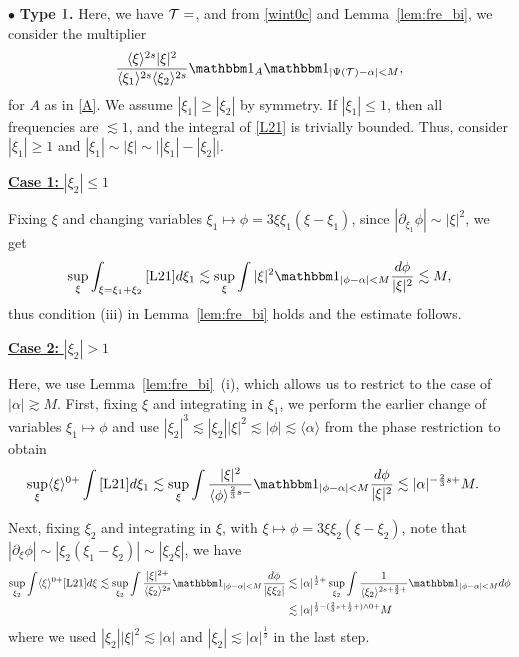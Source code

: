 \documentclass[a4paper,
11pt,  reqno]{amsart}
\makeatletter
\newcommand{\I}{\hspace{0.2mm}\textup{I}\hspace{0.2mm}}
\newcommand{\5}{\textup{V}}
\newcommand{\noi}{\noindent}
\newcommand{\ind}{\mathbbm 1}
\newcommand{\les}{\lesssim}
\theoremstyle{remark}
\newcommand{\bul}{\bullet}
\newcommand{\TT}{\mathcal{T}}
\newcommand{\al}{\alpha}
\newcommand{\ges}{\gtrsim}
\newcommand{\jb}[1]
{\langle #1 \rangle}
\def\<#1>{\csname MH@symb@#1\endcsname}
\numberwithin{equation}{section}
\numberwithin{theorem}{section}
\makeatother
\begin{document}
\smallskip

\noi
$\bul$ \textbf{Type $\I$.}
Here, we have $\TT = \<1>$, and
from \eqref{wint0c} and Lemma~\ref{lem:fre_bi}, we consider the multiplier
\begin{align}
\label{L21}
 \frac{\jb{\xi}^{2s} |\xi|^2 }{\jb{\xi_1}^{2s}\jb{\xi_2}^{2s}} 
    \ind_A \ind_{|\Psi(\TT) - \al| < M } , 
\end{align}
 for $A$ as in \eqref{A}. We assume $|\xi_1| \ge |\xi_2|$ by symmetry. 
If $|\xi_1| \le 1$, then all frequencies are $\les 1$, and the integral of \eqref{L21} is trivially bounded. Thus, consider $|\xi_1| \ge 1$ and $|\xi_1| \sim |\xi| \sim \big| |\xi_1| - |\xi_2| \big|$.


\smallskip

\noi\underline{\textbf{Case 1:} $|\xi_2| \le 1$}


Fixing $\xi$ and changing variables $\xi_1 \mapsto \phi = 3 \xi\xi_1(\xi-\xi_1)$, since $|\partial_{\xi_1}\phi| \sim |\xi|^2$, we get
\begin{align}\label{eq:estL21}
    \sup_\xi \int_{\xi=\xi_1+\xi_2} \eqref{L21} d\xi_1
    \les \sup_\xi \int |\xi|^2 \ind_{|\phi - \al| < M } \frac{d\phi}{|\xi|^2 } \les M , 
\end{align}
thus condition (iii) in Lemma~\ref{lem:fre_bi} holds and the estimate follows.

\smallskip 

\noi\underline{\textbf{Case 2:} $|\xi_2| > 1$}

Here, we use Lemma~\ref{lem:fre_bi}~(i), which allows us to restrict to the case of $|\al| \ges M$. 
First, fixing $\xi$ and integrating in $\xi_1$, we perform the earlier change of variables $\xi_1 \mapsto \phi$ and use $|\xi_2|^3 \les |\xi_2| |\xi|^2 \les |\phi| \les \jb{\al}$ from the phase restriction to obtain
\begin{align}
    \sup_{\xi} \jb{\xi}^{0+}\int \eqref{L21} d\xi_1
    &
    \les 
    \sup_\xi 
    \int \frac{|\xi|^{2}}{\jb{\phi}^{\frac23s-}} \ind_{|\phi-\al| < M} \frac{d\phi}{|\xi|^2} 
    \les |\al|^{-\frac23 s+} M . 
\end{align}

Next, fixing $\xi_2$ and integrating in $\xi$, with $\xi \mapsto \phi = 3\xi \xi_2 (\xi-\xi_2)$, note that $|\partial_\xi \phi| \sim |\xi_2 (\xi_1-\xi_2)| \sim |\xi_2 \xi|$, we have
\begin{align}
\sup_{\xi_2} \int \jb{\xi}^{0+} \eqref{L21} d\xi 
\les \sup_{\xi_2} \int \frac{|\xi|^{2+}}{\jb{\xi_2}^{2s}} \ind_{|\phi-\al| < M} \frac{d\phi}{|\xi\xi_2|} 
&
\les 
|\al|^{\frac12+}
\sup_{\xi_2} \int \frac{1}{\jb{\xi_2}^{2s+\frac32+}} \ind_{|\phi-\al| < M } d\phi
\\
&
\les
|\al|^{\frac12 - (\frac23 s + \frac12 +) \land 0 
+ } M
\end{align}
where we used $|\xi_2| |\xi|^2 \les |\al|$ and $|\xi_2| \les |\al|^{\frac13}$ in the last step.
\end{document}
